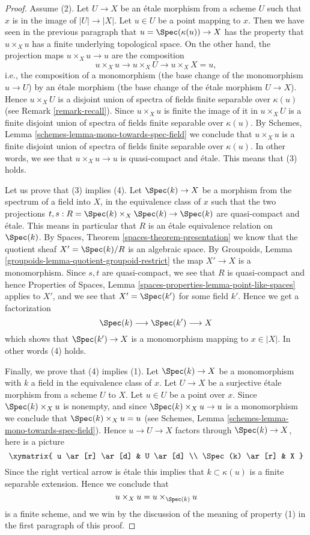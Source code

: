 \begin{proof}
\medskip\noindent
Assume (2). Let $U \to X$ be an \'etale morphism from a scheme $U$
such that $x$ is in the image of $|U| \to |X|$. Let $u \in U$ be
a point mapping to $x$. Then we have seen in the previous
paragraph that $u = \Spec(\kappa(u)) \to X$ has the property that
$u \times_X u$ has a finite underlying topological space. On the other
hand, the projection maps $u \times_X u \to u$ are the composition
$$
u \times_X u \longrightarrow
u \times_X U \longrightarrow
u \times_X X = u,
$$
i.e., the composition of a monomorphism (the base change of the monomorphism
$u \to U$) by an \'etale morphism (the base change of the \'etale morphism
$U \to X$). Hence $u \times_X U$ is a disjoint union of spectra of fields
finite separable over $\kappa(u)$ (see
Remark \ref{remark-recall}). Since $u \times_X u$ is finite the image
of it in $u \times_X U$ is a finite disjoint union of spectra of fields
finite separable over $\kappa(u)$. By
Schemes, Lemma \ref{schemes-lemma-mono-towards-spec-field}
we conclude that $u \times_X u$ is a finite disjoint union of spectra
of fields finite separable over $\kappa(u)$. In other words, we see that
$u \times_X u \to u$ is quasi-compact and \'etale. This means that (3) holds.

\medskip\noindent
Let us prove that (3) implies (4). Let $\Spec(k) \to X$ be a morphism
from the spectrum of a field into $X$, in the equivalence class of $x$
such that the two projections
$t, s : R = \Spec(k) \times_X \Spec(k)  \to \Spec(k)$
are quasi-compact and \'etale.
This means in particular
that $R$ is an \'etale equivalence relation on $\Spec(k)$.
By Spaces, Theorem \ref{spaces-theorem-presentation}
we know that the quotient sheaf
$X' = \Spec(k)/R$ is an algebraic space. By
Groupoids, Lemma \ref{groupoids-lemma-quotient-groupoid-restrict}
the map $X' \to X$ is a monomorphism.
Since $s, t$ are quasi-compact, we see that $R$ is quasi-compact and hence
Properties of Spaces,
Lemma \ref{spaces-properties-lemma-point-like-spaces}
applies to $X'$, and we see that
$X' = \Spec(k')$ for some field $k'$. Hence we get a factorization
$$
\Spec(k) \longrightarrow
\Spec(k') \longrightarrow X
$$
which shows that $\Spec(k') \to X$ is a monomorphism mapping
to $x \in |X|$. In other words (4) holds.

\medskip\noindent
Finally, we prove that (4) implies (1). Let $\Spec(k) \to X$
be a monomorphism with $k$ a field in the equivalence class of $x$.
Let $U \to X$ be a surjective \'etale morphism from a scheme $U$ to $X$.
Let $u \in U$ be a point over $x$. Since $\Spec(k) \times_X u$
is nonempty, and since $\Spec(k) \times_X u \to u$ is a monomorphism
we conclude that $\Spec(k) \times_X u = u$ (see
Schemes, Lemma \ref{schemes-lemma-mono-towards-spec-field}).
Hence $u \to U \to X$ factors through $\Spec(k) \to X$, here is
a picture
$$
\xymatrix{
u \ar[r] \ar[d] & U \ar[d] \\
\Spec(k) \ar[r] & X
}
$$
Since the right vertical arrow is \'etale this implies that
$k \subset \kappa(u)$ is a finite separable extension. Hence we conclude that
$$
u \times_X u = u \times_{\Spec(k)} u
$$
is a finite scheme, and we win by the discussion of the meaning of property
(1) in the first paragraph of this proof.
\end{proof}

